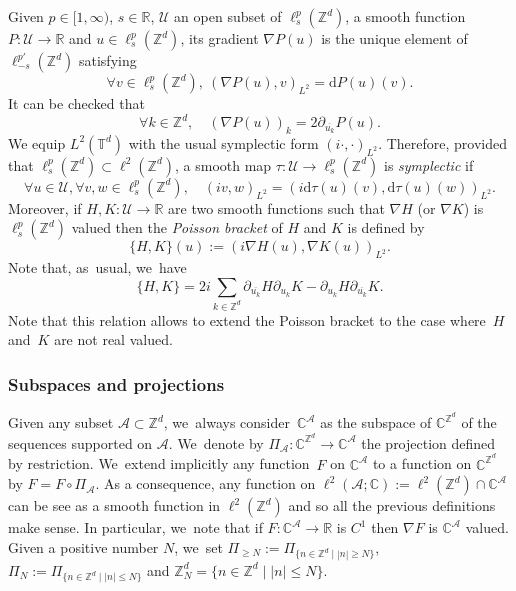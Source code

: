 \documentclass[10pt,a4paper]{amsart}
\theoremstyle{plain}
\theoremstyle{definition}
\newcommand{\1}{\mathbf{1}}
\begin{document}
Given $p\in[1,\infty)$, $s\in \mathbb{R}$, $\mathcal{U}$ an open subset of $\ell^p_s(\mathbb{Z}^d) $, a smooth function $P :\mathcal{U} \to \mathbb{R}$ and $u\in \ell^p_s(\mathbb{Z}^d)$, its gradient $\nabla P(u)$ is the unique element of $\ell^{p'}_{-s}(\mathbb{Z}^d)$ satisfying
\[
\forall v\in \ell^p_s(\mathbb{Z}^d), \ (\nabla P(u),v)_{L^2} = \mathrm{d}P(u)(v).
\]
It can be checked that
\begin{equation}
\label{eq:formula_grad}
\forall k \in \mathbb{Z}^d, \quad (\nabla P(u))_k = 2\partial_{\overline{u_k}} P(u).
\end{equation}
We equip $L^2(\mathbb{T}^d)$ with the usual symplectic form $(i\cdot,\cdot)_{L^2}$. Therefore, provided that $\ell^p_s(\mathbb{Z}^d) \subset \ell^2(\mathbb{Z}^d)$, a smooth map $\tau : \mathcal{U} \to \ell^p_s(\mathbb{Z}^d)$ is \emph{symplectic} if
\[
\forall u \in \mathcal{U}, \forall v,w \in \ell^p_s(\mathbb{Z}^d), \quad (iv,w)_{L^2} = (i\mathrm{d}\tau(u)(v),\mathrm{d}\tau(u)(w))_{L^2}.
\]
Moreover, if $H,K : \mathcal{U} \to \mathbb{R}$ are two smooth functions such that $\nabla H$ (or $\nabla K$) is $ \ell^p_s(\mathbb{Z}^d)$ valued then the \emph{Poisson bracket} of $H$ and $K$ is defined by
\[
\{ H,K\}(u):= (i \nabla H(u),\nabla K(u))_{L^2}.
\]
Note that, as~usual, we~have
\begin{equation}
\label{eq:pois-brak}
\{ H,K\}
=2i \sum_{k\in \mathbb{Z}^d} \partial_{\overline{u_k}}H \partial_{u_k} K - \partial_{u_k}H \partial_{\overline{u_k}} K.
\end{equation}
Note that this relation allows to extend the Poisson bracket to the case where~$H$ and~$K$ are not real valued.

\subsubsection{Subspaces and projections}
Given any subset $\mathcal{A} \subset \mathbb{Z}^d$, we~always consider~$\mathbb{C}^{\mathcal{A}}$ as the subspace of $\mathbb{C}^{\mathbb{Z}^d}$ of the sequences supported on $\mathcal{A}$. We~denote by $\Pi_{\mathcal{A}} : \mathbb{C}^{\mathbb{Z}^d} \to \mathbb{C}^{\mathcal{A}}$ the projection defined by restriction. We~extend implicitly any function~$F$ on $\mathbb{C}^{\mathcal{A}}$ to a function on $\mathbb{C}^{\mathbb{Z}^d}$ by $F=F\circ \Pi_{\mathcal{A}}$. As a consequence, any function on $\ell^2(\mathcal{A};\mathbb{C}):=\ell^2(\mathbb{Z}^d) \cap \mathbb{C}^{\mathcal{A}}$ can be see as a smooth function in $\ell^2(\mathbb{Z}^d)$ and so all the previous definitions make sense. In particular, we~note that if $F : \mathbb{C}^{\mathcal{A}} \to \mathbb{R} $ is $C^1$ then $\nabla F$ is $\mathbb{C}^{\mathcal{A}}$ valued. Given a positive number $N$, we~set $\Pi_{\geq N} := \Pi_{ \{ n \in \mathbb{Z}^d \mid |n| \geq N \} }$, $\Pi_{N} := \Pi_{ \{ n \in \mathbb{Z}^d \mid |n| \leq N \} }$ and $\mathbb{Z}^d_N = \{n \in \mathbb{Z}^d \mid |n| \leq N \}$.
\end{document}
